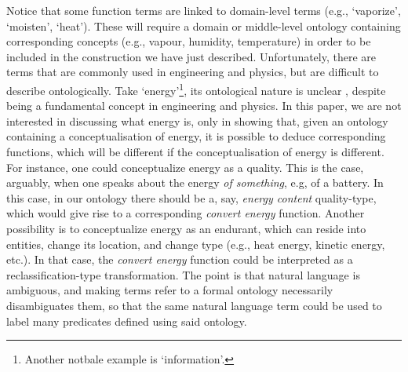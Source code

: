 \documentclass[sw]{iosart2x}
\newcommand{\quotes}[1]{`#1'}
\begin{document}
Notice that some function terms are linked to domain-level terms (e.g., \quotes{vaporize}, \quotes{moisten}, \quotes{heat}).
These will require a domain or middle-level ontology containing corresponding concepts (e.g., vapour, humidity, temperature) in order to be included in the construction we have just described.
Unfortunately, there are terms that are commonly used in engineering and physics, but are difficult to describe ontologically. 
Take \quotes{energy}\footnote{Another notbale example is \quotes{information}.}, its ontological nature is unclear \cite{mcginnOntologyEnergy2012}, despite being a fundamental concept in engineering and physics. 
In this paper, we are not interested in discussing what energy is, only in showing that, given an ontology containing a conceptualisation of energy, it is possible to deduce corresponding functions, which will be different if the conceptualisation of energy is different.
For instance, one could conceptualize energy as a quality. 
This is the case, arguably, when one speaks about the energy \textit{of something}, e.g, of a battery.
In this case, in our ontology there should be a, say, \textit{energy content} quality-type, which would give rise to a corresponding \textit{convert energy} function.
Another possibility is to conceptualize energy as an endurant, which can reside into entities, change its location, and change type (e.g., heat energy, kinetic energy, etc.).
In that case, the \textit{convert energy} function could be interpreted as a reclassification-type transformation.
The point is that natural language is ambiguous, and making terms refer to a formal ontology necessarily disambiguates them, so that the same natural language term could be used to label many predicates defined using said ontology. 
\end{document}
